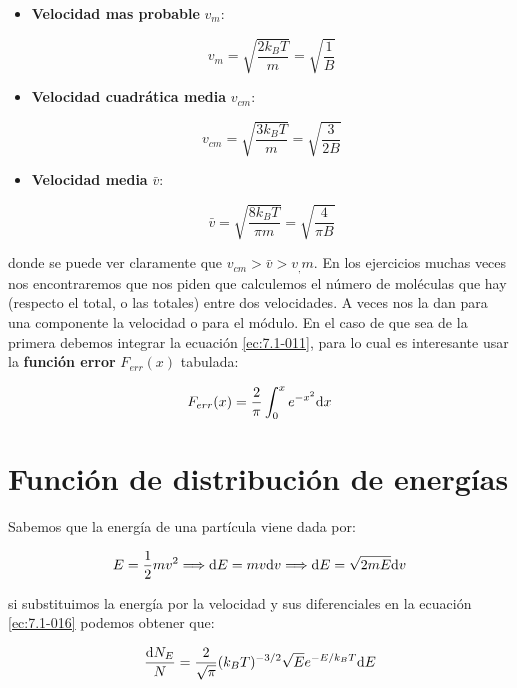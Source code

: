 \documentclass[12pt]{book}
\begin{document}
\begin{itemize}
\item \textbf{Velocidad mas probable} $v_m$: 

\begin{equation}
v_m = \sqrt{\dfrac{2 k_B T}{m}}  = \sqrt{\dfrac{1}{B}}
\end{equation}

\item \textbf{Velocidad cuadrática media} $v_{cm}$:

\begin{equation}
v_{cm} = \sqrt{\dfrac{3 k_B T}{m}} = \sqrt{\dfrac{3}{2B}}
\end{equation}

\item \textbf{Velocidad media} $\bar{v}$:

\begin{equation}
\bar{v} =  \sqrt{\dfrac{8 k_B T}{\pi m}} = \sqrt{\dfrac{4}{\pi B}} 
\end{equation}
\end{itemize}

donde se puede ver claramente que $v_{cm} > \bar{v} > v_,m$. En los ejercicios muchas veces nos encontraremos que nos piden que calculemos el número de moléculas que hay (respecto el total, o las totales) entre dos velocidades. A veces nos la dan para una componente la velocidad o para el módulo. En el caso de que sea de la primera debemos integrar la ecuación \ref{ec:7.1-011}, para lo cual es interesante usar la \textbf{función error} $F_{err} (x)$ tabulada:

\begin{equation}
F_{err} (x) = \dfrac{2}{\pi} \int_0^x e^{-x^2} \mathrm{d} x
\end{equation}

\section{Función de distribución de energías}

Sabemos que la energía de una partícula viene dada por:

$$ E = \dfrac{1}{2} m v^2 \Longrightarrow \mathrm{d} E = m v \mathrm{d} v \Longrightarrow \mathrm{d} E = \sqrt{2 m E} \mathrm{d} v $$

si substituimos la energía por la velocidad y sus diferenciales en la ecuación \ref{ec:7.1-016} podemos obtener que:

\begin{equation}
\dfrac{\mathrm{d} N_E}{N} = \dfrac{2}{\sqrt{\pi}} (k_B T)^{-3/2} \sqrt{E} e^{-E/k_B T} \mathrm{d} E
\end{equation}
\end{document}
